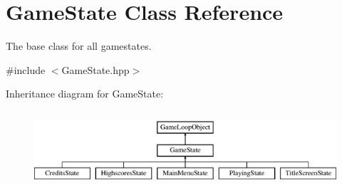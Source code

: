 \hypertarget{class_game_state}{}\section{Game\+State Class Reference}
\label{class_game_state}


The base class for all gamestates.  




{\ttfamily \#include $<$Game\+State.\+hpp$>$}

Inheritance diagram for Game\+State\+:\begin{figure}[H]
\begin{center}
\leavevmode
\includegraphics[height=2.871795cm]{class_game_state}
\end{center}
\end{figure}
